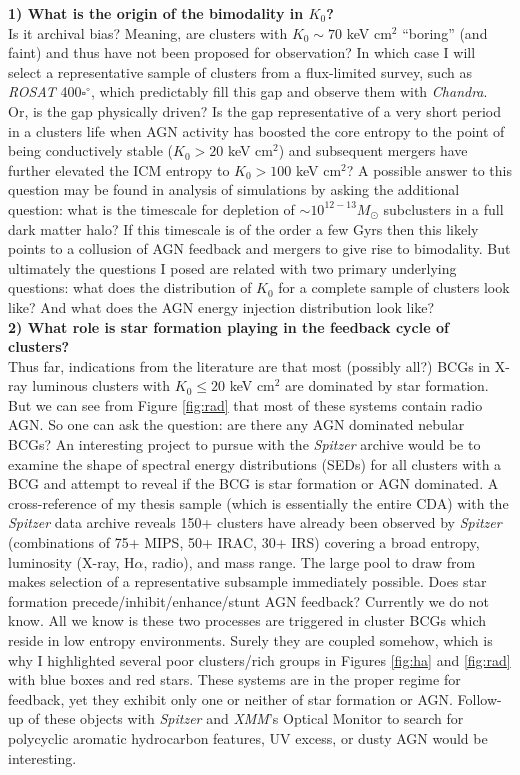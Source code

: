 \documentclass[11pt]{article}
\begin{document}
{\bf 1) What is the origin of the bimodality in $K_0$?}\\
Is it archival bias? Meaning, are clusters with $K_0 \sim 70$ keV
cm$^2$ ``boring'' (and faint) and thus have not been
proposed for observation? In which case I will select a representative
sample of clusters from a flux-limited survey, such as {\it ROSAT}
400$\square^\circ$, which predictably fill this gap and observe them with
{\it Chandra}. Or, is the gap physically driven? Is the gap
representative of a very short period in a clusters life when AGN
activity has boosted the core entropy to the point of being
conductively stable ($K_0 > 20$ keV cm$^2$) and subsequent mergers
have further elevated the ICM entropy to $K_0 > 100$ keV cm$^2$? A
possible answer to this question may be found in analysis of
simulations by asking the additional question: what is the timescale
for depletion of $\sim 10^{12-13} M_{\odot}$ subclusters in a full dark matter
halo? If this timescale is of the order a few Gyrs then this likely
points to a collusion of AGN feedback and mergers to give rise to
bimodality. But ultimately the questions I posed are related with two
primary underlying questions: what does the distribution of $K_0$ for
a complete sample of clusters look like? And what does the AGN energy
injection distribution look like?\\

{\bf 2) What role is star formation playing in the feedback cycle of clusters?}\\
Thus far, indications from the literature are that most (possibly all?)
BCGs in X-ray luminous clusters with $K_0 \leq 20$ keV cm$^2$ are
dominated by star formation. But we can see from Figure \ref{fig:rad} that most of
these systems contain radio AGN. So one can ask the question: are
there any AGN dominated nebular BCGs? An interesting project to pursue
with the {\it Spitzer} archive would be to examine the shape of
spectral energy distributions (SEDs) for all clusters with a BCG and
attempt to reveal if the BCG is star formation or AGN dominated.
A cross-reference of my thesis sample (which is essentially the
entire CDA) with the {\it Spitzer} data archive reveals 150+
clusters have already been observed by {\it Spitzer} (combinations of
75+ MIPS, 50+ IRAC, 30+ IRS) covering a broad entropy, luminosity (X-ray,
H$\alpha$, radio), and mass range. The large pool to draw from makes
selection of a representative subsample immediately possible. Does
star formation precede/inhibit/enhance/stunt AGN feedback? Currently
we do not know. All we know is these two processes are triggered in
cluster BCGs which reside in low entropy environments. Surely they are
coupled somehow, which is why I highlighted several poor clusters/rich
groups in Figures \ref{fig:ha} and \ref{fig:rad} with blue boxes and
red stars. These systems are in the proper regime for feedback, yet
they exhibit only one or neither of star formation or AGN. Follow-up of
these objects with {\it Spitzer} and {\it XMM}'s Optical Monitor to
search for polycyclic aromatic hydrocarbon features, UV excess, or
dusty AGN would be interesting.\\
\end{document}
